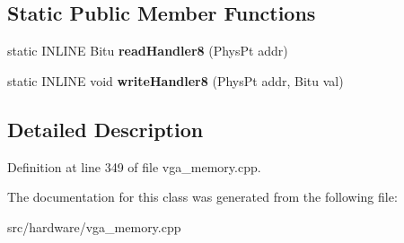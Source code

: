 \subsection*{Static Public Member Functions}
\begin{DoxyCompactItemize}
\item 
\hypertarget{classVGA__ET4000__ChainedVGA__Slow__Handler_aaaf88b1fe358e7af3b0411aa2a176fee}{static I\-N\-L\-I\-N\-E Bitu {\bfseries read\-Handler8} (Phys\-Pt addr)}\label{classVGA__ET4000__ChainedVGA__Slow__Handler_aaaf88b1fe358e7af3b0411aa2a176fee}

\item 
\hypertarget{classVGA__ET4000__ChainedVGA__Slow__Handler_ae2f914cb52258b4126058bfa4344198f}{static I\-N\-L\-I\-N\-E void {\bfseries write\-Handler8} (Phys\-Pt addr, Bitu val)}\label{classVGA__ET4000__ChainedVGA__Slow__Handler_ae2f914cb52258b4126058bfa4344198f}

\end{DoxyCompactItemize}


\subsection{Detailed Description}


Definition at line 349 of file vga\-\_\-memory.\-cpp.



The documentation for this class was generated from the following file\-:\begin{DoxyCompactItemize}
\item 
src/hardware/vga\-\_\-memory.\-cpp\end{DoxyCompactItemize}
